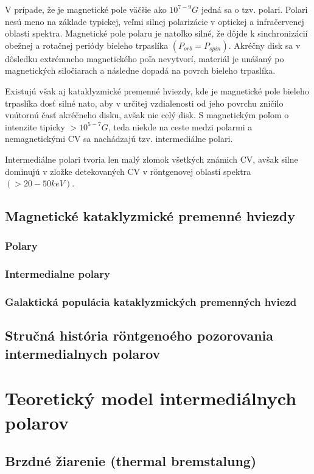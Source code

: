 \documentclass[oneside,a4paper,11pt]{report}
\begin{document}
V prípade, že je magnetické pole väčšie ako $10^{7 - 9} G$ jedná sa o tzv. polari. Polari nesú meno na 
základe typickej, veľmi silnej polarizácie v optickej a infračervenej 
oblasti spektra. Magnetické pole polaru je natoľko silné, že dôjde k sinchronizácií obežnej a rotačnej 
periódy bieleho trpaslíka $(P_{orb} = P_{spin})$. Akréčny disk sa v dôsledku extrémneho magnetického poľa
nevytvorí, materiál je unášaný po magnetických siločiarach a následne dopadá na povrch bieleho trpaslíka.

Existujú však aj kataklyzmické premenné hviezdy, kde je magnetické pole bieleho trpaslíka dosť silné nato, 
aby v určitej vzdialenosti od jeho povrchu zničilo vnútornú časť akréčneho disku, avšak nie celý disk. 
S magnetickým poľom o intenzite tipicky $>10^{5 - 7} G$, teda niekde na ceste medzi polarmi a nemagnetickými 
CV sa nachádzajú tzv. intermediálne polari.  

Intermediálne polari tvoria len malý zlomok všetkých známich CV, avšak silne dominujú v zložke detekovaných
CV v röntgenovej oblasti spektra $(>20-50keV)$. 
   
 
\section{Magnetické kataklyzmické premenné hviezdy}
\subsection{Polary}
\subsection{Intermedialne polary}
\subsection{Galaktická populácia kataklyzmických premenných hviezd}
\label{GXRE}
\section{Stručná história röntgenoého pozorovania intermedialnych polarov}

\chapter{Teoretický model intermediálnych polarov}
\section{Brzdné žiarenie (thermal bremstalung)}
\end{document}
